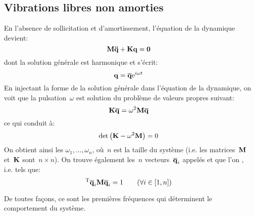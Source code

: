 \medskip
\subsection{Vibrations libres non amorties}

En l'absence de sollicitation et d'amortissement, l'équation de la dynamique devient:
\begin{equation} \MM{M}\VV{\ddot{q}}+\MM{K}\VV{q}=\VV{0} \end{equation}
dont la solution générale est harmonique et s'écrit:
\begin{equation} \VV{q}=\VV{\overline{q}}\mathrm{e}^{i\omega t} \end{equation}
En injectant la forme de la solution générale dans l'équation de la dynamique, on voit que la pulsation~$\omega$ est solution du problème de valeurs propres suivant:
\begin{equation} \MM{K}\VV{\overline{q}}=\omega^2\MM{M}\VV{\overline{q}} \end{equation}
ce qui conduit à:
\begin{equation} \det\left(\MM{K}-\omega^2\MM{M}\right)=0\end{equation}
\medskipvm
On obtient ainsi les 
$\omega_1,\ldots,\omega_n$, où~$n$ est la taille du système (i.e. les matrices~$\MM{M}$ et~$\MM{K}$ sont~$n\times n$).
\medskipvm
On trouve également les~$n$ vecteurs~$\VV{\overline{q}}_i$ appelés  et que l'on , i.e. tels que:
\begin{equation} \LL{\overline{q}}_i\MM{M}\VV{\overline{q}}_i=1 \qquad (\forall i\in[1,n]) \end{equation}
\medskipvm
{}

De toutes façons, ce sont les premières fréquences qui déterminent le comportement du système.

\medskip
{}
